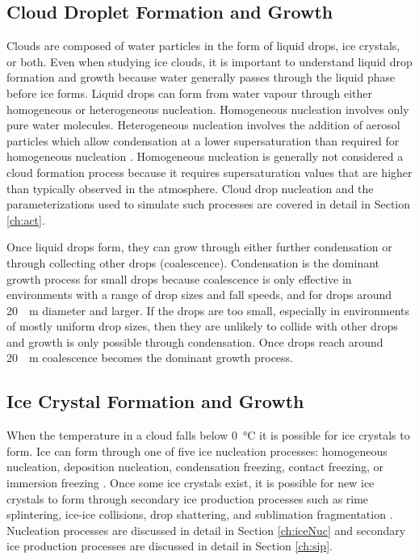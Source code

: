 \subsection{Cloud Droplet Formation and Growth}
Clouds are composed of water particles in the form of liquid drops, ice crystals, or both. Even when studying ice clouds, it is important to understand liquid drop formation and growth because water generally passes through the liquid phase before ice forms. Liquid drops can form from water vapour through either homogeneous or heterogeneous nucleation. Homogeneous nucleation involves only pure water molecules. Heterogeneous nucleation involves the addition of aerosol particles which allow condensation at a lower supersaturation than required for homogeneous nucleation \citep{rog1989,lamb2011}. Homogeneous nucleation is generally not considered a cloud formation process because it requires supersaturation values that are higher than typically observed in the atmosphere. Cloud drop nucleation and the parameterizations used to simulate such processes are covered in detail in Section \ref{ch:act}. 

Once liquid drops form, they can grow through either further condensation or through collecting other drops (coalescence). Condensation is the dominant growth process for small drops because coalescence is only effective in environments with a range of drop sizes and fall speeds, and for drops around \SI{20}{\mu m} diameter and larger. If the drops are too small, especially in environments of mostly uniform drop sizes, then they are unlikely to collide with other drops and growth is only possible through condensation. Once drops reach around \SI{20}{\mu m} coalescence becomes the dominant growth process. \citep{rog1989,lamb2011}

\subsection{Ice Crystal Formation and Growth}
When the temperature in a cloud falls below \SI{0}{\degreeCelsius} it is possible for ice crystals to form. Ice can form through one of five ice nucleation processes: homogeneous nucleation, deposition nucleation, condensation freezing, contact freezing, or immersion freezing \citep{rog1989,lamb2011,kanj2017}. Once some ice crystals exist, it is possible for new ice crystals to form through secondary ice production processes such as rime splintering, ice-ice collisions, drop shattering, and sublimation fragmentation \citep{bacon1998,sull2017,phil2018,kei2020}. Nucleation processes are discussed in detail in Section \ref{ch:iceNuc} and secondary ice production processes are discussed in detail in Section \ref{ch:sip}.

